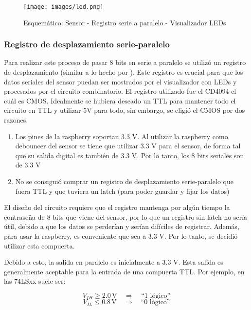 \documentclass[12pt,a4paper]{article}
\begin{document}
\begin{figure}[h!] %
    \centering    
    \texttt{[image: images/led.png]} %
    \caption{Esquemático: Sensor - Registro serie a paralelo - Visualizador LEDs }
    \label{fig:led}
\end{figure}

\subsubsection{Registro de desplazamiento serie-paralelo}

Para realizar este proceso de pasar 8 bits en serie a paralelo se utilizó un registro de desplazamiento (similar a lo hecho por \cite{micropython2025registro}). Este registro es crucial para que los datos seriales del sensor puedan ser mostrados por el visualizador con LEDs y procesados por el circuito combinatorio. El registro utilizado fue el CD4094 el cuál es CMOS. Idealmente se hubiera deseado un TTL para mantener todo el circuito en TTL y utilizar 5V para todo, sin embargo, se eligió el CMOS por dos razones. 

\begin{enumerate}
    \item Los pines de la raspberry soportan 3.3 V. Al utilizar la raspberry como debouncer del sensor se tiene que utilizar 3.3 V para el sensor, de forma tal que su salida digital es también de 3.3 V. Por lo tanto, los 8 bits seriales son de 3.3 V
    \item No se consiguió comprar un registro de desplazamiento serie-paralelo que fuera TTL y que tuviera un latch (para poder guardar y fijar los datos)
\end{enumerate}

El diseño del circuito requiere que el registro mantenga por algún tiempo la contraseña de 8 bits que viene del sensor, por lo que un registro sin latch no sería útil, debido a que los datos se perderían y serían difíciles de registrar. Además, para usar la raspberry, es conveniente que sea a 3.3 V. Por lo tanto, se decidió utilizar esta compuerta.

Debido a esto, la salida en paralelo es inicialmente a 3.3 V. Esta salida es generalmente aceptable para la entrada de una compuerta TTL. Por ejemplo, en las 74LSxx suele ser:

\[
V_{IH} \geq 2.0 \,\text{V} \quad \Rightarrow \quad \text{``1 lógico''}
\]
\[
V_{IL} \leq 0.8 \,\text{V} \quad \Rightarrow \quad \text{``0 lógico''}
\]
\end{document}
